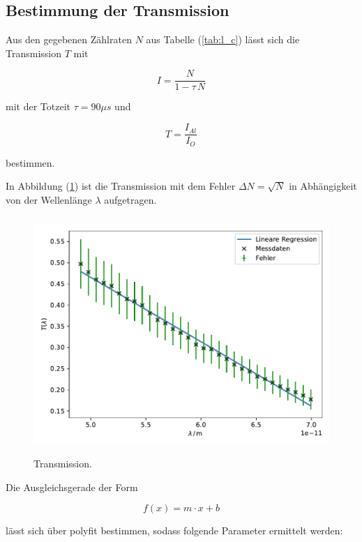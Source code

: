 \newpage
\subsection{Bestimmung der Transmission}
Aus den gegebenen Zählraten $N$ aus Tabelle (\ref{tab:l_c}) lässt sich die Transmission $T$ mit

\begin{equation}
I = \frac{N}{1 - \tau \, N}
\label{eqn:tot}
\end{equation}

\noindent
mit der Totzeit $\tau = 90 \mu s$ und 

\begin{equation}
T = \frac{I_{Al}}{I_O}
\label{eqn:trans}
\end{equation}

\noindent
bestimmen.

\noindent
In Abbildung (\ref{fig:trans}) ist die Transmission mit dem Fehler $\Delta N = \sqrt{N}$ in Abhängigkeit von der Wellenlänge $\lambda$ aufgetragen.

\begin{figure}
    \centering
       \includegraphics[height=9cm]{daten/transmission.pdf}
       \caption{Transmission.}
       \label{fig:trans}
\end{figure}

\noindent
Die Ausgleichsgerade der Form

\begin{equation*}
f(x) = m \cdot x + b
\end{equation*}

\noindent
lässt sich über polyfit bestimmen, sodass folgende Parameter ermittelt werden:

